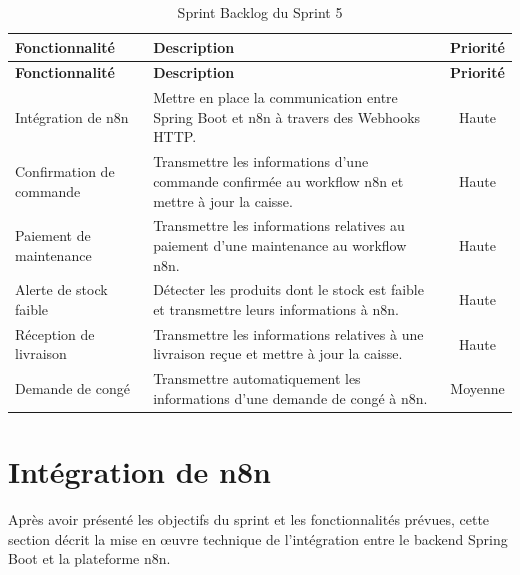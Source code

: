 \begin{longtable}{|>{\RaggedRight\arraybackslash}p{4cm}|>{\RaggedRight\arraybackslash}p{8cm}|c|}
\caption{Sprint Backlog du Sprint 5}
\label{tab:sprint5-backlog}\\

\hline

\textbf{Fonctionnalité} & \textbf{Description} & \textbf{Priorité} \\

\hline

\endfirsthead

\hline

\textbf{Fonctionnalité} & \textbf{Description} & \textbf{Priorité} \\

\hline

\endhead

Intégration de n8n &
Mettre en place la communication entre Spring Boot et n8n à travers des Webhooks HTTP. &
Haute \\

\hline

Confirmation de commande &
Transmettre les informations d'une commande confirmée au workflow n8n et mettre à jour la caisse. &
Haute \\

\hline

Paiement de maintenance &
Transmettre les informations relatives au paiement d'une maintenance au workflow n8n. &
Haute \\

\hline

Alerte de stock faible &
Détecter les produits dont le stock est faible et transmettre leurs informations à n8n. &
Haute \\

\hline

Réception de livraison &
Transmettre les informations relatives à une livraison reçue et mettre à jour la caisse. &
Haute \\

\hline

Demande de congé &
Transmettre automatiquement les informations d'une demande de congé à n8n. &
Moyenne \\

\hline

\end{longtable}

\section{Intégration de n8n}
Après avoir présenté les objectifs du sprint et les fonctionnalités prévues, cette section décrit la mise en œuvre technique de l'intégration entre le backend Spring Boot et la plateforme n8n.
